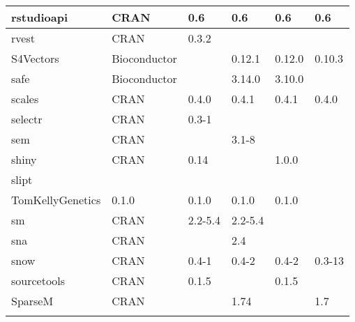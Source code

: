 \begin{longtable}{|llllll|}
rstudioapi                    & CRAN                      & 0.6         & 0.6         & 0.6            & 0.6              \\ \hline
rvest                         & CRAN                      & 0.3.2       &             &                &                   \\ \hline \rowcolor{gray!25}
S4Vectors                     & Bioconductor              &             & 0.12.1      & 0.12.0         & 0.10.3           \\ \hline
safe                          & Bioconductor              &             & 3.14.0      & 3.10.0         &                   \\ \hline \rowcolor{gray!25}
scales                        & CRAN                      & 0.4.0       & 0.4.1       & 0.4.1          & 0.4.0            \\ \hline
selectr                       & CRAN                      & 0.3-1       &             &                &                   \\ \hline \rowcolor{gray!25}
sem                           & CRAN                      &             & 3.1-8       &                &                  \\ \hline
shiny                         & CRAN                      & 0.14        &             & 1.0.0          &                   \\ \hline \rowcolor{gray!25}
slipt                         & \begin{tabular}[c]{@{}l@{}}GitHub \\ TomKellyGenetics \end{tabular}  & 0.1.0       & 0.1.0       & 0.1.0          & 0.1.0            \\ \hline
sm                            & CRAN                      & 2.2-5.4     & 2.2-5.4     &                &                   \\ \hline \rowcolor{gray!25}
sna                           & CRAN                      &             & 2.4         &                &                  \\ \hline
snow                          & CRAN                      & 0.4-1       & 0.4-2       & 0.4-2          & 0.3-13            \\ \hline \rowcolor{gray!25}
sourcetools                   & CRAN                      & 0.1.5       &             & 0.1.5          &                  \\ \hline
SparseM                       & CRAN                      &             & 1.74        &                & 1.7               \\ \hline \rowcolor{gray!25}

\end{longtable}
